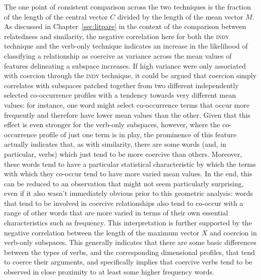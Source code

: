 The one point of consistent comparison across the two techniques is the fraction of the length of the central vector $C$ divided by the length of the mean vector $M$.  As discussed in Chapter~\ref{sec:litpare} in the context of the comparison between relatedness and similarity, the negative correlation here for both the \textsc{indy} technique and the verb-only technique indicates an increase in the likelihood of classifying a relationship as coercive as variance across the mean values of features delineating a subspace increases.  If high variance were only associated with coercion through the \textsc{indy} technique, it could be argued that coercion simply correlates with subspaces patched together from two different independently selected co-occurrence profiles with a tendency towards very different mean values: for instance, one word might select co-occurrence terms that occur more frequently and therefore have lower mean values than the other.  Given that this effect is even stronger for the verb-only subspaces, however, where the co-occurrence profile of just one term is in play, the prominence of this feature actually indicates that, as with similarity, there are some words (and, in particular, verbs) which just tend to be more coercive than others.  Moreover, these words tend to have a particular statistical characteristic by which the terms with which they co-occur tend to have more varied mean values.  In the end, this can be reduced to an observation that might not seem particularly surprising, even if it also wasn't immediately obvious prior to this geometric analysis: words that tend to be involved in coercive relationships also tend to co-occur with a range of other words that are more varied in terms of their own essential characteristics such as frequency.  This interpretation is further supported by the negative correlation between the length of the maximum vector $X$ and coercion in verb-only subspaces.  This generally indicates that there are some basic differences between the types of verbs, and the corresponding dimensional profiles, that tend to coerce their arguments, and specifically implies that coercive verbs tend to be observed in close proximity to at least some higher frequency words.


